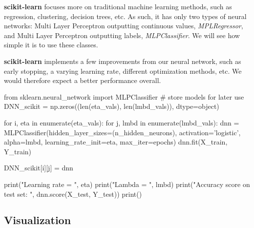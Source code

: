 \documentclass[%
oneside,                 %
final,                   %
10pt]{article}
\begin{document}
\textbf{scikit-learn} focuses more
on traditional machine learning methods, such as regression,
clustering, decision trees, etc. As such, it has only two types of
neural networks: Multi Layer Perceptron outputting continuous values,
\emph{MPLRegressor}, and Multi Layer Perceptron outputting labels,
\emph{MLPClassifier}. We will see how simple it is to use these classes.

\textbf{scikit-learn} implements a few improvements from our neural network,
such as early stopping, a varying learning rate, different
optimization methods, etc. We would therefore expect a better
performance overall.


















\bpycod
from sklearn.neural_network import MLPClassifier
# store models for later use
DNN_scikit = np.zeros((len(eta_vals), len(lmbd_vals)), dtype=object)

for i, eta in enumerate(eta_vals):
    for j, lmbd in enumerate(lmbd_vals):
        dnn = MLPClassifier(hidden_layer_sizes=(n_hidden_neurons), activation='logistic',
                            alpha=lmbd, learning_rate_init=eta, max_iter=epochs)
        dnn.fit(X_train, Y_train)
        
        DNN_scikit[i][j] = dnn
        
        print("Learning rate  = ", eta)
        print("Lambda = ", lmbd)
        print("Accuracy score on test set: ", dnn.score(X_test, Y_test))
        print()

\epycod


\subsection{Visualization}
\end{document}
